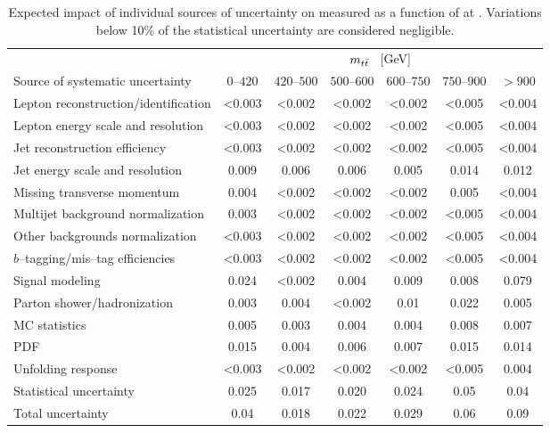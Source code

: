 \begin{table}[!htbp]\centering
\begin{tabular}{l c c c c c c}
\toprule
 &\multicolumn{6}{c}{$m_{t\bar{t}}{}$ ~[GeV]} \\
Source of systematic uncertainty&$0$--$420$&$420$--$500$&$500$--$600$&$600$--$750$&$750$--$900$&$>900$ \\
\midrule
Lepton reconstruction/identification & <0.003 & <0.002 & <0.002 & <0.002 & <0.005 & <0.004\\
Lepton energy scale and resolution & <0.003 & <0.002 & <0.002 & <0.002 & <0.005 & <0.004 \\
Jet reconstruction efficiency & <0.003 & <0.002 & <0.002 & <0.002 & <0.005 & <0.004  \\
Jet energy scale and resolution & 0.009 & 0.006 & 0.006 & 0.005 & 0.014 & 0.012 \\
Missing transverse momentum & 0.004 & <0.002 & <0.002 & <0.002 & 0.005 & <0.004  \\
Multijet background normalization & 0.003 & <0.002 & <0.002 & <0.002 & <0.005 & <0.004  \\
Other backgrounds normalization & <0.003 & <0.002 & <0.002 & <0.002 & <0.005 & <0.004  \\
$b$--tagging/mis--tag efficiencies & <0.003 & <0.002 & <0.002 & <0.002 & <0.005 & <0.004  \\
Signal modeling & 0.024 & <0.002 & 0.004 & 0.009 & 0.008  & 0.079 \\
Parton shower/hadronization & 0.003 & 0.004 & <0.002 & 0.01 & 0.022 &0.005 \\
MC statistics & 0.005 & 0.003 & 0.004 & 0.004 & 0.008 & 0.007\\
PDF & 0.015 &0.004 & 0.006 & 0.007 & 0.015 & 0.014\\
Unfolding response & <0.003  & <0.002 & <0.002  & <0.002 & <0.005  & 0.004\\
\midrule
Statistical uncertainty & 0.025 & 0.017 & 0.020 & 0.024 & 0.05 & 0.04\\
\midrule
Total uncertainty  & 0.04 & 0.018 & 0.022 & 0.029 & 0.06 & 0.09\\
\bottomrule
\end{tabular}
\caption{Expected impact of individual sources of uncertainty on 
  \ac{} measured as a function of \mtt{} at \seventev{}. Variations below 10\%
  of the statistical uncertainty are considered negligible.}
\label{table:Systematics_mtt8tev}
\end{table}
